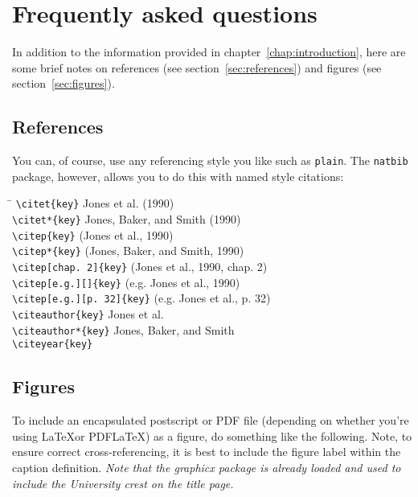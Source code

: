 \chapter{Frequently asked questions\label{chap:faq}}

In addition to the information provided in
chapter~\ref{chap:introduction}, here are some brief notes on
references (see section~\ref{sec:references}) and figures (see
section~\ref{sec:figures}).

\section{References\label{sec:references}}

You can, of course, use any referencing style you like such as
\verb+plain+.  The \verb+natbib+ package, however, allows you to do
this with named style citations:

\begin{tabbing}
\hspace{3in} \= \kill
\verb-\citet{key}- \> Jones et al. (1990) \\
\verb-\citet*{key}- \> Jones, Baker, and Smith (1990) \\
\verb-\citep{key}- \> (Jones et al., 1990) \\
\verb-\citep*{key}- \> (Jones, Baker, and Smith, 1990) \\
\verb-\citep[chap. 2]{key}- \> (Jones et al., 1990, chap. 2) \\
\verb-\citep[e.g.][]{key}- \> (e.g. Jones et al., 1990) \\
\verb-\citep[e.g.][p. 32]{key}- \> (e.g. Jones et al., p. 32) \\
\verb-\citeauthor{key}- \> Jones et al. \\
\verb-\citeauthor*{key}- \> Jones, Baker, and Smith \\
\verb-\citeyear{key}-  \\
\end{tabbing}

\section{Figures\label{sec:figures}}

To include an encapsulated postscript or PDF file (depending on whether you're using \LaTeX or PDF\LaTeX) as a figure, do
something like the following.  Note, to ensure correct
cross-referencing, it is best to include the figure label within
the caption definition.  \emph{Note that the graphicx package 
is already loaded and used to include the
University crest on the title page.}

